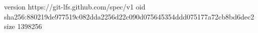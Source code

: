 version https://git-lfs.github.com/spec/v1
oid sha256:880219de977519c082dda2256d22c090d075645354ddd075177a72cb8bd6dec2
size 1398256
